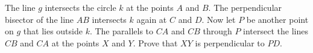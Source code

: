 The line $g$ intersects the circle $k$ at the points $A$ and $B$.
The perpendicular bisector of the line $AB$ intersects $k$ again at $C$ and $D$.
Now let $P$ be another point on $g$ that lies outside $k$. The parallels
to $CA$ and $CB$ through $P$ intersect the lines $CB$ and $CA$ at the points $X$ and $Y$.
Prove that $XY$ is perpendicular to $PD$.
